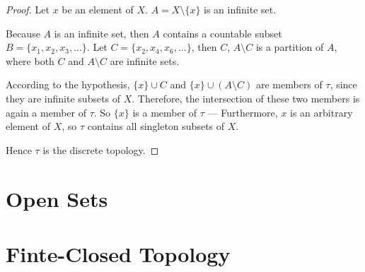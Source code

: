 \begin{proof}
	Let $x$ be an element of $X$. $A = X\setminus\{ x \}$ is an infinite set.

	Because $A$ is an infinite set, then $A$ contains a countable subset $B = \{ x_{1}, x_{2}, x_{3}, \ldots \}$. Let $C = \{ x_{2}, x_{4}, x_{6}, \ldots \}$, then $C$, $A\setminus C$ is a partition of $A$, where both $C$ and $A\setminus C$ are infinite sets.

	According to the hypothesis, $\{ x \}\cup C$ and $\{ x \}\cup (A\setminus C)$ are members of $\tau$, since they are infinite subsets of $X$. Therefore, the intersection of these two members is again a member of $\tau$. So $\{ x \}$ is a member of $\tau$ --- Furthermore, $x$ is an arbitrary element of $X$, so $\tau$ contains all singleton subsets of $X$.

	Hence $\tau$ is the discrete topology.
\end{proof}
\newpage

\section{Open Sets}



\section{Finte-Closed Topology}



